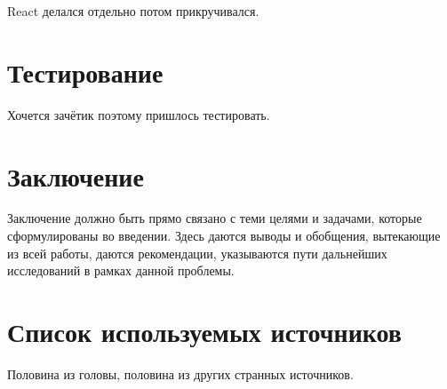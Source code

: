 	React делался отдельно потом прикручивался.
 	
\section{Тестирование}
	Хочется зачётик поэтому пришлось тестировать.
		 
\section{Заключение}
	Заключение должно быть прямо связано с теми целями и задачами, которые
	сформулированы во введении. Здесь даются выводы и обобщения, вытекающие из всей 
	работы, даются рекомендации, указываются пути дальнейших исследований в рамках
	данной проблемы.

\section{Список используемых источников}
	Половина из головы, половина из других странных источников.


